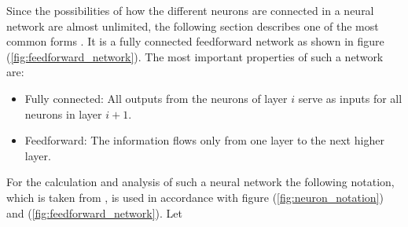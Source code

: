 Since the possibilities of how the different neurons are connected in a neural network are almost unlimited, the following section describes one of the most common forms \cite{kriesel}. It is a fully connected feedforward network as shown in figure (\ref{fig:feedforward_network}). The most important properties of such a network are:

\begin{itemize}
	\item Fully connected: All outputs from the neurons of layer $i$ serve as inputs for all neurons in layer $i+1$.
	\item Feedforward: The information flows only from one layer to the next higher layer. 
\end{itemize}

For the calculation and analysis of such a neural network the following notation, which is taken from \cite{Mar_Pri}, is used in accordance with figure (\ref{fig:neuron_notation}) and (\ref{fig:feedforward_network}). Let

